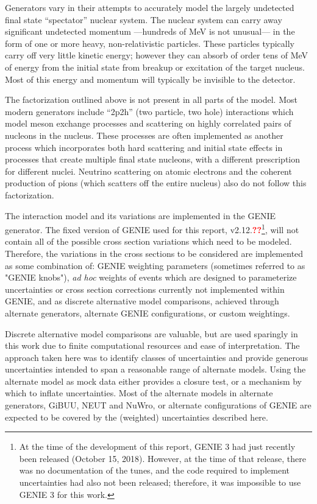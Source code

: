 Generators vary in their attempts to accurately model the largely undetected final state ``spectator'' nuclear system.  The nuclear system can carry away significant undetected momentum ---hundreds of MeV is not unusual--- in the form of one or more heavy, non-relativistic particles.  These particles typically carry off very little kinetic energy; however they can absorb of order tens of MeV of energy from the initial state from breakup or excitation of the target nucleus.  Most of this energy and momentum will typically be invisible to the detector. 

The factorization outlined above is not present in all parts of the model.  Most modern generators include ``2p2h'' (two particle, two hole) interactions which model meson exchange processes and scattering on highly correlated pairs of nucleons in the nucleus.  These processes are often implemented as another process which incorporates both hard scattering and initial state effects in processes that create multiple final state nucleons, with a different prescription for different nuclei.
Neutrino scattering on atomic electrons and the coherent production of pions (which scatters off the entire nucleus) also
do not follow this factorization. 

The interaction model and its variations are implemented in the  GENIE generator.  The fixed version of GENIE used for this report, v2.12.{\bf\textcolor{red}{??}}\footnote{At the time of the development of this report, GENIE 3 had just recently been released (October 15, 2018).  However, at the time of that release, there was no documentation of the tunes, and the code required to implement uncertainties had also not been released; therefore, it was impossible to use GENIE 3 for this work.}, will not contain all of the possible cross section variations which need to be modeled.  Therefore, the variations in the cross sections to be considered are implemented as some combination of: GENIE weighting parameters (sometimes referred to as "GENIE knobs"), {\it ad hoc} weights of events which are designed to parameterize uncertainties or cross section corrections currently not implemented within GENIE, and as discrete alternative model comparisons, achieved through alternate generators, alternate GENIE configurations, or custom weightings. 

Discrete alternative model comparisons are valuable, but are used sparingly in this work due to finite computational resources and ease of interpretation. The approach taken here was to identify classes of uncertainties and provide generous uncertainties intended to span a reasonable range of alternate models. Using the alternate model as mock data either provides a closure test, or a mechanism by which to inflate uncertainties. Most of the alternate models in alternate generators, GiBUU, NEUT and NuWro,  or alternate configurations of GENIE are expected to be covered by the (weighted) uncertainties described here. 

